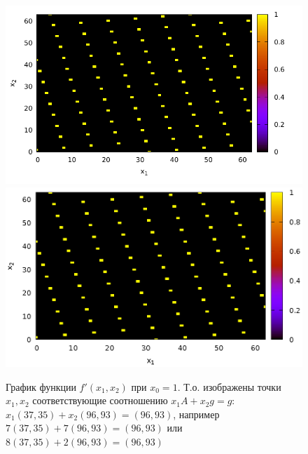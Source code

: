 \begin{figure}
\centering

\ifpdf
\includegraphics[angle=0]
{./part4/quantcomp/picellipticdiscretlog1.pdf}
\else
\includegraphics[angle=0]
{./part4/quantcomp/picellipticdiscretlog1.eps}
\fi

%



\caption{График функции 
$f'(x_1, x_2)$ при $x_0 = 1$. Т.о. изображены точки $x_1, x_2$
  соответствующие соотношению $x_1 A + x_2 g = g$: 
  $x_1 (37, 35) + x_2 (96,93) = (96,93)$, например
  $7 (37, 35) + 7 (96,93) = (96,93)$ или $8 (37, 35) + 2 (96,93) = (96,93)$} 
\label{fig:part4:quantcomp:dle1}
\end{figure}
